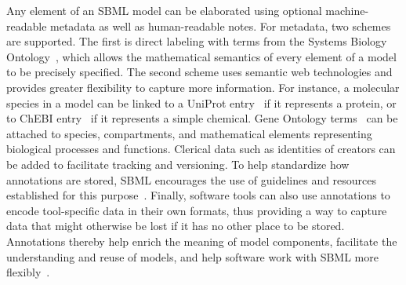 \documentclass{sbml-paper}
\begin{document}
Any element of an SBML model can be elaborated using optional machine-readable metadata as well as human-readable notes.  For metadata, two schemes are supported.  The first is direct labeling with terms from the Systems Biology Ontology~\citep[SBO;][]{courtot2011controlled}, which allows the mathematical semantics of every element of a model to be precisely specified.  The second scheme uses semantic web technologies and provides greater flexibility to capture more information.  For instance, a molecular species in a model can be linked to a UniProt entry~\citep{uniprot2017} if it represents a protein, or to ChEBI entry~\citep{hastings2013chebi} if it represents a simple chemical.  Gene Ontology terms~\citep[GO;][]{ashburner2000gene} can be attached to species, compartments, and mathematical elements representing biological processes and functions.  Clerical data such as identities of creators can be added to facilitate tracking and versioning.  To help standardize how annotations are stored, SBML encourages the use of guidelines and resources established for this purpose~\citep{le_novere_2005, Laibe2007miriam, Juty2012identifiers}.  Finally, software tools can also use annotations to encode tool-specific data in their own formats, thus providing a way to capture data that might otherwise be lost if it has no other place to be stored.  Annotations thereby help enrich the meaning of model components, facilitate the understanding and reuse of models, and help software work with SBML more flexibly~\citep{krause2011chapter, schulz2011retrieval, Lister2010annotation, Schulz2012propagating, Swainston2009libannotationsbml}.

\clearpage
\end{document}
